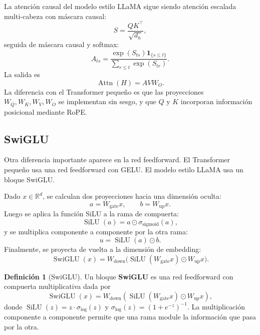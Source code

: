 \documentclass[11pt]{report}
\newenvironment{tcolorbox}[1][]{\par\medskip\noindent\ignorespaces}{\par\medskip}
\theoremstyle{definition}
\newtheorem{definicion}{Definición}[section]
\theoremstyle{plain}
\numberwithin{equation}{section}
\newcommand{\SwiGLU}{\operatorname{SwiGLU}}
\newcommand{\SiLU}{\operatorname{SiLU}}
\begin{document}
La atención causal del modelo estilo LLaMA sigue siendo atención escalada multi-cabeza con máscara causal:
\begin{equation*}
    S
    =
    \frac{QK^\top}{\sqrt{d_h}},
\end{equation*}
seguida de máscara causal y softmax:
\begin{equation*}
    A_{ts}
    =
    \frac{\exp(S_{ts})\mathbf{1}_{\{s\leq t\}}}
    {\sum_{r\leq t}\exp(S_{tr})}.
\end{equation*}
La salida es
\begin{equation*}
    \operatorname{Attn}(H)
    =
    AVW_O.
\end{equation*}
La diferencia con el Transformer pequeño es que las proyecciones \(W_Q,W_K,W_V,W_O\) se implementan sin sesgo, y que \(Q\) y \(K\) incorporan información posicional mediante RoPE.

\subsection{SwiGLU}

Otra diferencia importante aparece en la red feedforward. El Transformer pequeño usa una red feedforward con GELU. El modelo estilo LLaMA usa un bloque SwiGLU.

Dado \(x\in\mathbb{R}^d\), se calculan dos proyecciones hacia una dimensión oculta:
\begin{equation*}
    a=W_{\mathrm{gate}}x,
    \qquad
    b=W_{\mathrm{up}}x.
\end{equation*}
Luego se aplica la función SiLU a la rama de compuerta:
\begin{equation*}
    \operatorname{SiLU}(a)
    =
    a\odot \sigma_{\mathrm{sigmoid}}(a),
\end{equation*}
y se multiplica componente a componente por la otra rama:
\begin{equation*}
    u
    =
    \operatorname{SiLU}(a)\odot b.
\end{equation*}
Finalmente, se proyecta de vuelta a la dimensión de embedding:
\begin{equation*}
    \operatorname{SwiGLU}(x)
    =
    W_{\mathrm{down}}
    \bigl(
        \operatorname{SiLU}(W_{\mathrm{gate}}x)
        \odot
        W_{\mathrm{up}}x
    \bigr).
\end{equation*}

\begin{tcolorbox}[colback=blue!8, colframe=blue!8, boxrule=0pt]
\begin{definicion}[SwiGLU]
Un bloque \textbf{SwiGLU} es una red feedforward con compuerta multiplicativa dada por
\begin{equation*}
    \SwiGLU(x)
    =
    W_{\mathrm{down}}
    \left(
        \SiLU(W_{\mathrm{gate}}x)
        \odot
        W_{\mathrm{up}}x
    \right),
\end{equation*}
donde \(\SiLU(z)=z\cdot\sigma_{\mathrm{log}}(z)\) y \(\sigma_{\mathrm{log}}(z)=(1+e^{-z})^{-1}\). La multiplicación componente a componente permite que una rama module la información que pasa por la otra.
\end{definicion}
\end{tcolorbox}
\end{document}
